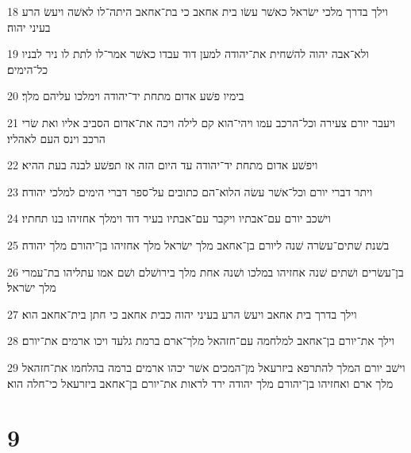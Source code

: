 \par 18 וילך בדרך מלכי ישׂראל כאשׁר עשׂו בית אחאב כי בת־אחאב היתה־לו לאשׁה ויעשׂ הרע בעיני יהוה׃
\par 19 ולא־אבה יהוה להשׁחית את־יהודה למען דוד עבדו כאשׁר אמר־לו לתת לו ניר לבניו כל־הימים׃
\par 20 בימיו פשׁע אדום מתחת יד־יהודה וימלכו עליהם מלך׃
\par 21 ויעבר יורם צעירה וכל־הרכב עמו ויהי־הוא קם לילה ויכה את־אדום הסביב אליו ואת שׂרי הרכב וינס העם לאהליו׃
\par 22 ויפשׁע אדום מתחת יד־יהודה עד היום הזה אז תפשׁע לבנה בעת ההיא׃
\par 23 ויתר דברי יורם וכל־אשׁר עשׂה הלוא־הם כתובים על־ספר דברי הימים למלכי יהודה׃
\par 24 וישׁכב יורם עם־אבתיו ויקבר עם־אבתיו בעיר דוד וימלך אחזיהו בנו תחתיו׃
\par 25 בשׁנת שׁתים־עשׂרה שׁנה ליורם בן־אחאב מלך ישׂראל מלך אחזיהו בן־יהורם מלך יהודה׃
\par 26 בן־עשׂרים ושׁתים שׁנה אחזיהו במלכו ושׁנה אחת מלך בירושׁלם ושׁם אמו עתליהו בת־עמרי מלך ישׂראל׃
\par 27 וילך בדרך בית אחאב ויעשׂ הרע בעיני יהוה כבית אחאב כי חתן בית־אחאב הוא׃
\par 28 וילך את־יורם בן־אחאב למלחמה עם־חזהאל מלך־ארם ברמת גלעד ויכו ארמים את־יורם׃
\par 29 וישׁב יורם המלך להתרפא ביזרעאל מן־המכים אשׁר יכהו ארמים ברמה בהלחמו את־חזהאל מלך ארם ואחזיהו בן־יהורם מלך יהודה ירד לראות את־יורם בן־אחאב ביזרעאל כי־חלה הוא׃

\chapter{9}

